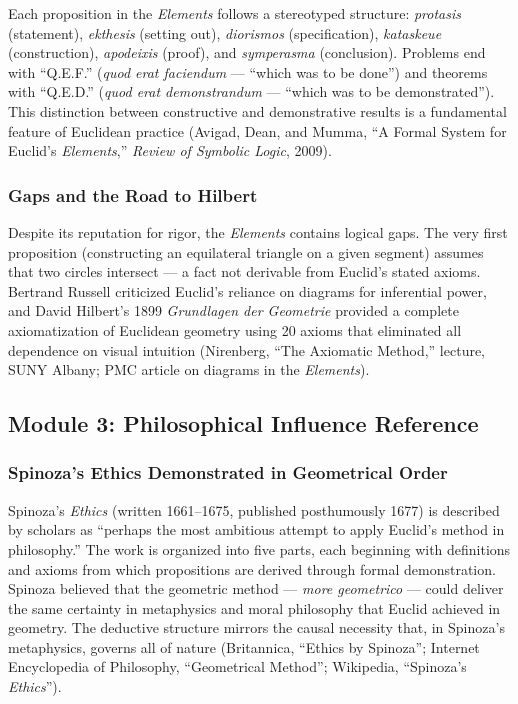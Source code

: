 \documentclass[11pt,letterpaper]{article}
\begin{document}
Each proposition in the \textit{Elements} follows a stereotyped structure: \textit{protasis} (statement), \textit{ekthesis} (setting out), \textit{diorismos} (specification), \textit{kataskeue} (construction), \textit{apodeixis} (proof), and \textit{symperasma} (conclusion). Problems end with ``Q.E.F.'' (\textit{quod erat faciendum} --- ``which was to be done'') and theorems with ``Q.E.D.'' (\textit{quod erat demonstrandum} --- ``which was to be demonstrated''). This distinction between constructive and demonstrative results is a fundamental feature of Euclidean practice (Avigad, Dean, and Mumma, ``A Formal System for Euclid's \textit{Elements},'' \textit{Review of Symbolic Logic}, 2009).

\subsubsection{Gaps and the Road to Hilbert}

Despite its reputation for rigor, the \textit{Elements} contains logical gaps. The very first proposition (constructing an equilateral triangle on a given segment) assumes that two circles intersect --- a fact not derivable from Euclid's stated axioms. Bertrand Russell criticized Euclid's reliance on diagrams for inferential power, and David Hilbert's 1899 \textit{Grundlagen der Geometrie} provided a complete axiomatization of Euclidean geometry using 20 axioms that eliminated all dependence on visual intuition (Nirenberg, ``The Axiomatic Method,'' lecture, SUNY Albany; PMC article on diagrams in the \textit{Elements}).

\subsection{Module 3: Philosophical Influence Reference}

\subsubsection{Spinoza's Ethics Demonstrated in Geometrical Order}

Spinoza's \textit{Ethics} (written 1661--1675, published posthumously 1677) is described by scholars as ``perhaps the most ambitious attempt to apply Euclid's method in philosophy.'' The work is organized into five parts, each beginning with definitions and axioms from which propositions are derived through formal demonstration. Spinoza believed that the geometric method --- \textit{more geometrico} --- could deliver the same certainty in metaphysics and moral philosophy that Euclid achieved in geometry. The deductive structure mirrors the causal necessity that, in Spinoza's metaphysics, governs all of nature (Britannica, ``Ethics by Spinoza''; Internet Encyclopedia of Philosophy, ``Geometrical Method''; Wikipedia, ``Spinoza's \textit{Ethics}'').
\end{document}
